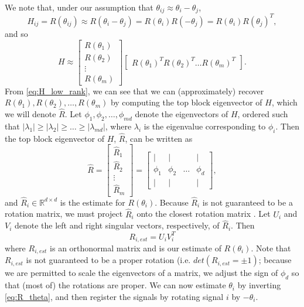 \documentclass{pnastwo}
\begin{document}
\begin{article}
\begin{materials}
We note that, under our assumption that $\theta_{ij} \approx \theta_i - \theta_j$, 
\begin{equation} 
H_{ij} = R(\theta_{ij}) \approx R(\theta_i - \theta_j) = R(\theta_i) R(-\theta_j) = R(\theta_i) R(\theta_j)^T,
\end{equation}
 and so
\begin{equation} \label{eq:H_low_rank}
	H \approx 
	\begin{bmatrix}
	R(\theta_1) \\
	R(\theta_2) \\
	\vdots \\
	R(\theta_m)
	\end{bmatrix}
	\begin{bmatrix}
	R(\theta_1)^T R(\theta_2)^T \dots R(\theta_m)^T
	\end{bmatrix}.
\end{equation}
%
From \eqref{eq:H_low_rank}, we can see that we can (approximately) recover $R(\theta_1), R(\theta_2), \dots, R(\theta_m)$ by computing the top block eigenvector of $H$, which we will denote $\hat{R}$.
%
Let $\phi_1, \phi_2, \dots, \phi_{md}$ denote the eigenvectors of $H$, ordered such that $|\lambda_1| \ge |\lambda_2| \ge \dots \ge |\lambda_{md}|$, where $\lambda_i$ is the eigenvalue corresponding to $\phi_i$. 
%
Then the top block eigenvector of $H$, $\hat{R}$, can be written as
\begin{equation}
\hat{R} = 
\begin{bmatrix}
\hat{R}_1 \\
\hat{R}_2 \\
\vdots \\
\hat{R}_m
\end{bmatrix} =
\begin{bmatrix}
| & | & & | \\
\phi_1 & \phi_2 & \dots & \phi_d \\
| & | & & | 
\end{bmatrix},
\end{equation}
and $\hat{R}_i \in \mathbb{R}^{d \times d}$ is the estimate for $R(\theta_i)$. 
%
Because $\hat{R}_i$ is not guaranteed to be a rotation matrix, we must project $\hat{R}_i$ onto the closest rotation matrix \cite{...}. 
%
Let $U_i$ and $V_i$ denote the left and right singular vectors, respectively, of $\hat{R}_i$.
%
Then
\begin{equation} \label{eq:R_est}
R_{i, est} = U_i V_i^T
\end{equation} 
where $R_{i, est}$ is an orthonormal matrix and is our estimate of $R(\theta_i)$. 
%
Note that $R_{i, est}$ is not guaranteed to be a proper rotation (i.e. $det(R_{i, est} = \pm 1)$; because we are permitted to scale the eigenvectors of a matrix, we adjust the sign of $\phi_d$ so that (most of) the rotations are proper. 
%
We can now estimate $\theta_{i}$ by inverting \eqref{eq:R_theta}, and then register the signals by rotating signal $i$ by $-\theta_i$. 


\end{materials}
\end{article}
\end{document}
